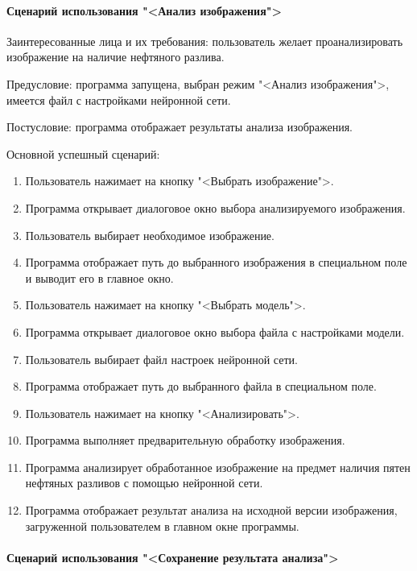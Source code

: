 \paragraph{Сценарий использования "<Анализ изображения">}

Заинтересованные лица и их требования: пользователь желает проанализировать изображение на наличие нефтяного разлива.

Предусловие: программа запущена, выбран режим "<Анализ изображения">, имеется файл с настройками нейронной сети.

Постусловие: программа отображает результаты анализа изображения.

Основной успешный сценарий:

\begin{enumerate}
	\item Пользователь нажимает на кнопку "<Выбрать изображение">.
	\item Программа открывает диалоговое окно выбора анализируемого изображения.
	\item Пользователь выбирает необходимое изображение.
	\item Программа отображает путь до выбранного изображения в специальном поле и выводит его в главное окно.
	\item Пользователь нажимает на кнопку "<Выбрать модель">.
	\item Программа открывает диалоговое окно выбора файла с настройками модели.
	\item Пользователь выбирает файл настроек нейронной сети.
	\item Программа отображает путь до выбранного файла в специальном поле.
	\item Пользователь нажимает на кнопку "<Анализировать">.
	\item Программа выполняет предварительную обработку изображения.
	\item Программа анализирует обработанное изображение на предмет наличия пятен нефтяных разливов с помощью нейронной сети.
	\item Программа отображает результат анализа на исходной версии изображения, загруженной пользователем в главном окне программы.
\end{enumerate}

\paragraph{Сценарий использования "<Сохранение результата анализа">}

